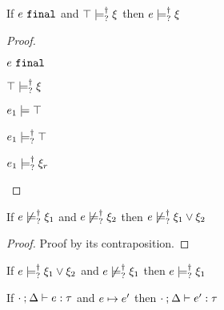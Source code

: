 \begin{corol}
  \label{corol:nn-material-entailment-exhaust}
  If $e ~\mathtt{final}$ and $\top \models_{?}^{\dag} \xi$ then $e \models_{?}^{\dag} \xi$
\end{corol}
\begin{proof}
  \begin{pfsteps*}
  \item $e ~\mathtt{final}$  
  \item $\top \models_{?}^{\dag} \xi$  
  \item $e_1 \models \top$  
  \item $e_1 \models_{?}^{\dag} \top$  
  \item $e_1 \models_{?}^{\dag} \xi_r$ 
  \end{pfsteps*}
  \resetpfcounter
\end{proof}

\begin{lem}
  \label{lem:or-nn-satisfy}
  If $e \not\models_{?}^{\dag} \xi_1$ and $e \not\models_{?}^{\dag} \xi_2$ then $e \not\models_{?}^{\dag} \xi_1 \vee \xi_2$
\end{lem}
\begin{proof}
Proof by its contraposition.
\end{proof}

\begin{lem}
  \label{lem:satisfy-substraction}
  If $e \models_{?}^{\dag} \xi_1 \vee \xi_2$ and $e \not\models_{?}^{\dag} \xi_1$ then $e \models_{?}^{\dag} \xi_1$
\end{lem}

\begin{thm}[Preservation]
  \label{thrm:preservation}
  If $\cdot \mathbin{;} \Delta \vdash e : \tau$ and $e \mapsto e'$
  then $\cdot \mathbin{;} \Delta \vdash e' : \tau$
\end{thm}

